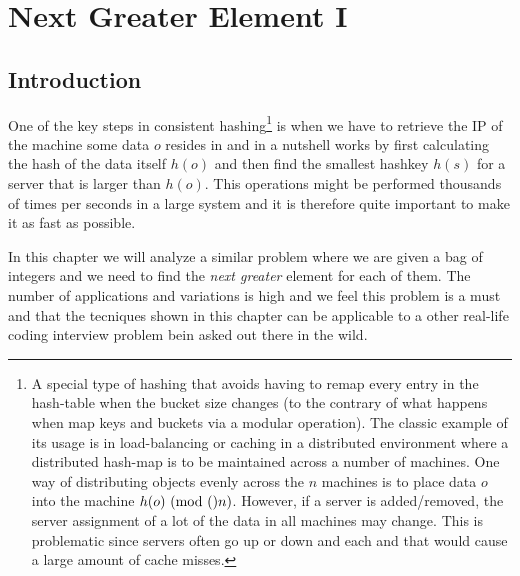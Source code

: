 %



\chapter{Next Greater Element \RN{1}}
\label{ch:next_greater_element}
\section*{Introduction}
One of the key steps in consistent hashing\footnote{A special type of hashing that avoids having to remap every entry in the hash-table when the bucket size changes (to the contrary of what happens when map keys and buckets via a modular operation). The classic example of its usage is in load-balancing or caching in a distributed environment where a distributed hash-map is to be maintained across a number of machines. One way of distributing objects evenly across the $n$ machines is to place data $o$ into the machine $h(o) \ (\mathrm{mod}\ ()n)$.
However, if a server is added/removed, the server assignment of a lot of the data in all machines may change.
This is problematic since servers often go up or down and each and that would cause a large amount of cache misses. }
is when we have to retrieve the IP of the machine some data $o$ resides in and in a nutshell works by  first calculating the hash of the data itself $h(o)$ and then find the smallest hashkey $h(s)$ for a server that is larger than $h(o)$.
This operations might be performed thousands of times per seconds in a large system and it is therefore quite important to make it as fast as possible. 

In this chapter we will analyze a similar problem where we are given a bag of integers and we need to find the \textit{next greater} element for each of them. The number of applications and variations is high and we feel this problem is a must and that the tecniques shown in this chapter can be applicable to a other real-life coding interview problem bein asked out there in the wild. 

